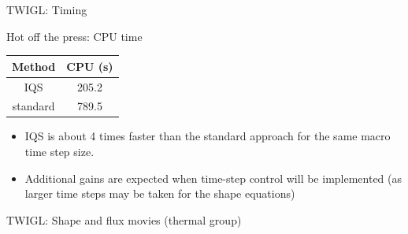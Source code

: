 \documentclass[8pt]{beamer}
\begin{document}
\begin{frame}{TWIGL:  Timing}


\begin{block}{Hot off the press: CPU time}

\begin{table}[h]
\begin{center}
\begin{tabular}{|c|c|}
\hline 
Method   &  CPU (s)  \\ \hline 
IQS      &  205.2    \\ \hline 
standard &  789.5    \\ \hline 
\end{tabular}
\end{center}
\end{table}

\begin{itemize}
\item
IQS is about 4 times faster than the standard approach for the same macro time step size.
\item
Additional gains are expected when time-step control will be implemented (as larger time steps may be taken for the shape equations)
\end{itemize}

\end{block}

\end{frame}

\begin{frame}{TWIGL:  Shape and flux movies (thermal group)}
  \begin{columns}
  \end{columns}
\end{frame}
\end{document}
